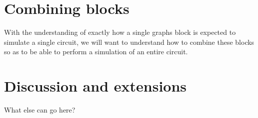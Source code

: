 \documentclass[../thesis-main/thesis-main]{subfiles}
\begin{document}
\section{Combining blocks}

With the understanding of exactly how a single graphs block is expected to simulate a single circuit, we will want to understand how to combine these blocks so as to be able to perform a simulation of an entire circuit.  






\section{Discussion and extensions}

What else can go here?


\biblio
\end{document}
